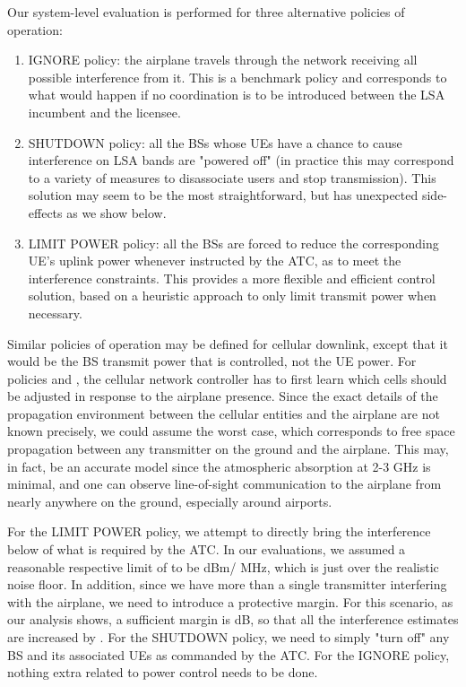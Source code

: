 \documentclass[journal]{IEEEtran}
\begin{document}
Our system-level evaluation is performed for three alternative policies of operation:

\begin{enumerate}
	\item IGNORE policy: the airplane travels through the network receiving all possible interference from it. This is a benchmark policy and corresponds to what would happen if no coordination is to be introduced between the LSA incumbent and the licensee.
	\item SHUTDOWN policy: all the BSs whose UEs have a chance to cause interference on LSA bands are "powered off" (in practice this may correspond to a variety of measures to disassociate users and stop transmission). This solution may seem to be the most straightforward, but has unexpected side-effects as we show below.
	\item LIMIT POWER policy: all the BSs are forced to reduce the corresponding UE's uplink power whenever instructed by the ATC, as to meet the interference constraints. This provides a more flexible and efficient control solution, based on a heuristic approach to only limit transmit power when necessary.
\end{enumerate}

Similar policies of operation may be defined for cellular downlink, except that it would be the BS transmit power that is controlled, not the UE power. For policies  and , the cellular network controller has to first learn which cells should be adjusted in response to the airplane presence. Since the exact details of the propagation environment between the cellular entities and the airplane are not known precisely, we could assume the worst case, which corresponds to free space propagation between any transmitter on the ground and the airplane. This may, in fact, be an accurate model since the atmospheric absorption at 2-3 GHz is minimal, and one can observe line-of-sight communication to the airplane from nearly anywhere on the ground, especially around airports.



For the LIMIT POWER policy, we attempt to directly bring the interference below of what is required by the ATC. In our evaluations, we assumed a reasonable respective limit of  to be  dBm/ MHz, which is just over the realistic noise floor. In addition, since we have more than a single transmitter interfering with the airplane, we need to introduce a protective margin. For this scenario, as our analysis shows, a sufficient margin is  dB, so that all the interference estimates are increased by . For the SHUTDOWN policy, we need to simply "turn off" any BS and its associated UEs as commanded by the ATC. For the IGNORE policy, nothing extra related to power control needs to be done.
\end{document}

